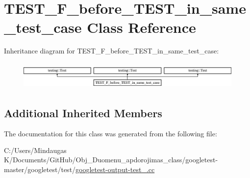 \hypertarget{class_t_e_s_t___f__before___t_e_s_t__in__same__test__case}{}\section{T\+E\+S\+T\+\_\+\+F\+\_\+before\+\_\+\+T\+E\+S\+T\+\_\+in\+\_\+same\+\_\+test\+\_\+case Class Reference}
\label{class_t_e_s_t___f__before___t_e_s_t__in__same__test__case}
Inheritance diagram for T\+E\+S\+T\+\_\+\+F\+\_\+before\+\_\+\+T\+E\+S\+T\+\_\+in\+\_\+same\+\_\+test\+\_\+case\+:\begin{figure}[H]
\begin{center}
\leavevmode
\includegraphics[height=1.441442cm]{dd/df2/class_t_e_s_t___f__before___t_e_s_t__in__same__test__case}
\end{center}
\end{figure}
\subsection*{Additional Inherited Members}


The documentation for this class was generated from the following file\+:\begin{DoxyCompactItemize}
\item 
C\+:/\+Users/\+Mindaugas K/\+Documents/\+Git\+Hub/\+Obj\+\_\+\+Duomenu\+\_\+apdorojimas\+\_\+class/googletest-\/master/googletest/test/\mbox{\hyperlink{googletest-master_2googletest_2test_2googletest-output-test___8cc}{googletest-\/output-\/test\+\_\+.\+cc}}\end{DoxyCompactItemize}
